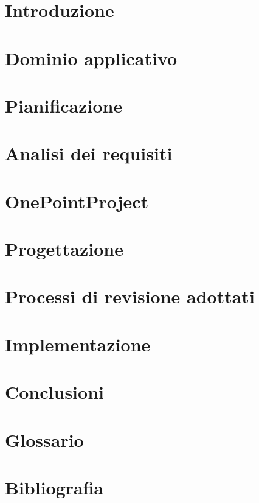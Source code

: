 
%

\def\INDICE		{true} 		%
\def\TABELLE	{true} 		%
\def\FIGURE		{true} 		%




\pagestyle{stilecapitolinumerati}

\section[Introduzione]{Introduzione}

\newpage

\section{Dominio applicativo}

\newpage

\section{Pianificazione}

\newpage

\section{Analisi dei requisiti}

\newpage

\section{OnePointProject}

\newpage

\section{Progettazione}

\newpage

\section{Processi di revisione adottati}

\newpage

\section{Implementazione}

\newpage

\section{Conclusioni}

\newpage

\pagestyle{stilecapitolinonnumerati}

\section*{Glossario}

\newpage

\section*{Bibliografia}

\newpage

